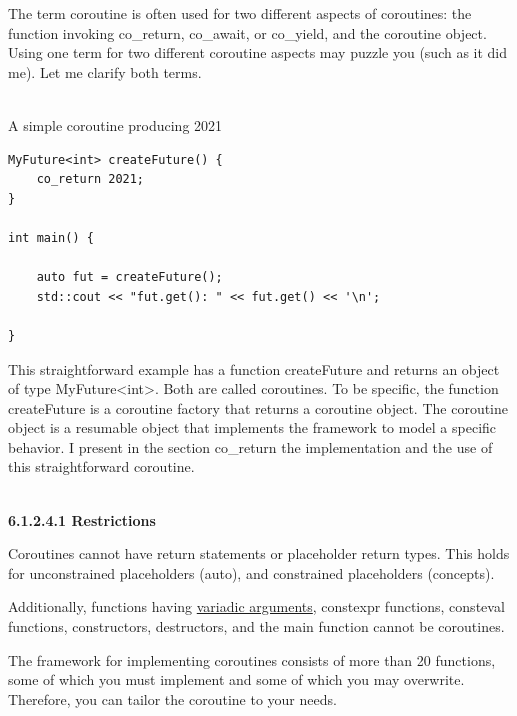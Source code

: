 \begin{tcolorbox}[breakable,enhanced jigsaw,colback=red!5!white,colframe=red!75!black,title={Distinguish Between the Coroutine Factory and the Coroutine Object}]
	
The term coroutine is often used for two different aspects of coroutines: the function invoking co\_return, co\_await, or co\_yield, and the coroutine object. Using one term for two different coroutine aspects may puzzle you (such as it did me). Let me clarify both terms.

\hspace*{\fill} \\ %
\noindent
A simple coroutine producing 2021
\begin{lstlisting}[style=styleCXX]
MyFuture<int> createFuture() {
	co_return 2021;
}

int main() {
	
	auto fut = createFuture();
	std::cout << "fut.get(): " << fut.get() << '\n';
	
}
\end{lstlisting}

This straightforward example has a function createFuture and returns an object of type MyFuture<int>. Both are called coroutines. To be specific, the function createFuture is a coroutine factory that returns a coroutine object. The coroutine object is a resumable object that implements the framework to model a specific behavior. I present in the section co\_return the implementation and the use of this straightforward coroutine.
	
\end{tcolorbox}

\hspace*{\fill} \\ %
\noindent
\textbf{6.1.2.4.1 \hspace{0.2cm} Restrictions}

Coroutines cannot have return statements or placeholder return types. This holds for unconstrained placeholders (auto), and constrained placeholders (concepts).

Additionally, functions having \href{https://en.cppreference.com/w/cpp/language/variadic_arguments}{variadic arguments}, constexpr functions, consteval functions, constructors, destructors, and the main function cannot be coroutines.


The framework for implementing coroutines consists of more than 20 functions, some of which you must implement and some of which you may overwrite. Therefore, you can tailor the coroutine to your needs.

